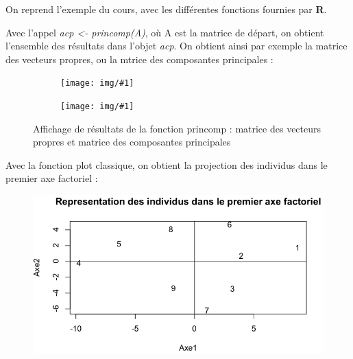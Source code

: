 \documentclass[a4paper,11pt]{article}
\newcommand{\InsertFig}[1]{
\begin{figure}[H]
\begin{center}
\texttt{[image: img/\#1]}
\end{center}
\end{figure}}
\begin{document}

\noindent On reprend l'exemple du cours, avec les différentes fonctions fournies par \textbf{R}.

\noindent Avec l'appel \textit{acp <- princomp(A)}, où A est la matrice de départ, on obtient l'ensemble des résultats dans l'objet \textit{acp}. On obtient ainsi par exemple la matrice des vecteurs propres, ou la mtrice des composantes principales : 

\begin{figure}[H]

  \begin{minipage}[b]{0.45\linewidth}
   \centering
   \InsertFig{acp$loadings} 
  \end{minipage}
\hfill
  \begin{minipage}[b]{0.45\linewidth}
   \centering
  \InsertFig{acp$scores.png}     
  \end{minipage}

  \caption{Affichage de résultats de la fonction princomp : matrice des vecteurs propres et matrice des composantes principales}
  \label{fig:ma_fig}
  \end{figure}
  
  \noindent Avec la fonction plot classique, on obtient la projection des individus dans le premier axe factoriel : 
  
\begin{figure}[H]
\begin{center}
\includegraphics[width=.7\textwidth]{img/acp1.png}
\end{center}
\end{figure}
\end{document}
